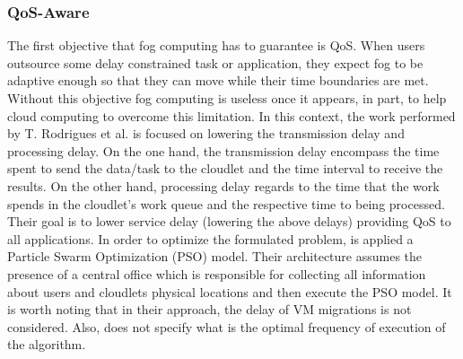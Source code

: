 \subsubsection{QoS-Aware}
The first objective that fog computing has to guarantee is QoS. When users outsource some delay constrained task or application, they expect fog to be adaptive enough so that they can move while their time boundaries are met. Without this objective fog computing is useless once it appears, in part, to help cloud computing to overcome this limitation.
\noindent\tab In this context, the work performed by T. Rodrigues \cite{rodrigues2017pso} et al. is focused on lowering the transmission delay and processing delay. On the one hand, the transmission delay encompass the time spent to send the data/task to the cloudlet and the time interval to receive the results. On the other hand, processing delay regards to the time that the work spends in the cloudlet's work queue and the respective time to being processed. Their goal is to lower service delay (lowering the above delays) providing QoS to all applications. In order to optimize the formulated problem, is applied a Particle Swarm Optimization (PSO) model. Their architecture assumes the presence of a central office which is responsible for collecting all information about users and cloudlets physical locations and then execute the PSO model. It is worth noting that in their approach, the delay of VM migrations is not considered. Also, does not specify what is the optimal frequency of execution of the algorithm.\\
